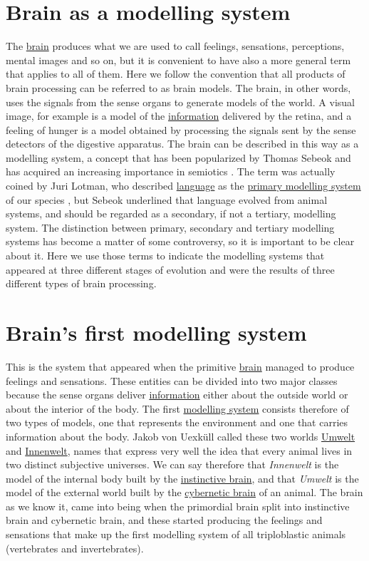 \documentclass[12pt]{article}
\begin{document}
\section{Brain as a modelling system}
The \hyperlink{brain}{brain} produces what we are used to call feelings, sensations, perceptions, mental images and so on, but it is convenient to have also a more general term that applies to all of them. Here we follow the convention that all products of brain processing can be referred to as brain models. The brain, in other words, uses the signals from the sense organs to generate models of the world. A visual image, for example is a model of the \hyperlink{information}{information} delivered by the retina, and a feeling of hunger is a model obtained by processing the signals sent by the sense detectors of the digestive apparatus. The brain can be described in this way as a modelling system, a concept that has been popularized by Thomas Sebeok and has acquired an increasing importance in semiotics \cite{sebeok00:_forms_meanin_model_syst}. The term was actually coined by Juri Lotman, who described \hyperlink{language}{language} as the \hyperlink{brains_first_modelling_system}{primary modelling system} of our species \cite{lotman77:_primary_secondary_model_syst}, but Sebeok underlined that language evolved from animal systems, and should be regarded as a secondary, if not a tertiary, modelling system. The distinction between primary, secondary and tertiary modelling systems has become a matter of some controversy, so it is important to be clear about it. Here we use those terms to indicate the modelling systems that appeared at three different stages of evolution and were the results of three different types of brain processing. 


\hypertarget{brains_first_modelling_system}{}
\section{Brain's first modelling system}
This is the system that appeared when the primitive \hyperlink{brain}{brain} managed to produce feelings and sensations. These entities can be divided into two major classes because the sense organs deliver \hyperlink{information}{information} either about the outside world or about the interior of the body. The first \hyperlink{modelling_systems}{modelling system} consists therefore of two types of models, one that represents the environment and one that carries information about the body. Jakob von Uexk\"{u}ll \cite{uexkull09:_umwel_innen_tiere} called these two worlds \hyperlink{umwelt}{Umwelt} and \hyperlink{innenwelt}{Innenwelt}, names that express very well the idea that every animal lives in two distinct subjective universes. We can say therefore that \textit{Innenwelt} is the model of the internal body built by the \hyperlink{instinctive_brain}{instinctive brain}, and that \textit{Umwelt} is the model of the external world built by the \hyperlink{cybernetic_brain}{cybernetic brain} of an animal. The brain as we know it, came into being when the primordial brain split into instinctive brain and cybernetic brain, and these started producing the feelings and sensations that make up the first modelling system of all triploblastic animals (vertebrates and invertebrates). 
\end{document}
